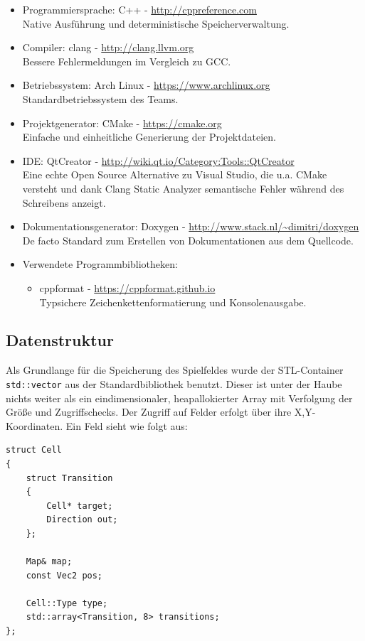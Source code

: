 \documentclass[12pt,a4paper]{article}
\begin{document}
\begin{itemize}
\item Programmiersprache: C++ - \url{http://cppreference.com} \\
Native Ausführung und deterministische Speicherverwaltung.
\item Compiler: clang - \url{http://clang.llvm.org} \\
Bessere Fehlermeldungen im Vergleich zu GCC.
\item Betriebssystem: Arch Linux - \url{https://www.archlinux.org} \\
Standardbetriebssystem des Teams.
\item Projektgenerator: CMake - \url{https://cmake.org} \\
Einfache und einheitliche Generierung der Projektdateien.
\item IDE: QtCreator - \url{http://wiki.qt.io/Category:Tools::QtCreator} \\
Eine echte Open Source Alternative zu Visual Studio, die u.a. CMake versteht und dank Clang Static Analyzer semantische Fehler während des Schreibens anzeigt.
\item Dokumentationsgenerator: Doxygen - \url{http://www.stack.nl/~dimitri/doxygen} \\
De facto Standard zum Erstellen von Dokumentationen aus dem Quellcode.

\item Verwendete Programmbibliotheken:
\begin{itemize}
\item cppformat - \url{https://cppformat.github.io} \\
Typsichere Zeichenkettenformatierung und Konsolenausgabe.
	
\end{itemize}

\end{itemize}

\subsection{Datenstruktur}
Als Grundlange für die Speicherung des Spielfeldes wurde der STL-Container \texttt{std::vector} aus der Standardbibliothek benutzt. Dieser ist unter der Haube nichts weiter als ein eindimensionaler, heapallokierter Array mit Verfolgung der Größe und Zugriffschecks. Der Zugriff auf Felder erfolgt über ihre X,Y-Koordinaten.
Ein Feld sieht wie folgt aus:

\begin{lstlisting}[caption=Cell Struktur, label=lst:cell-struct]
struct Cell
{
	struct Transition
	{
		Cell* target;
		Direction out;
	};
	
	Map& map;
	const Vec2 pos;
	
	Cell::Type type;
	std::array<Transition, 8> transitions;
};
\end{lstlisting}
\end{document}
